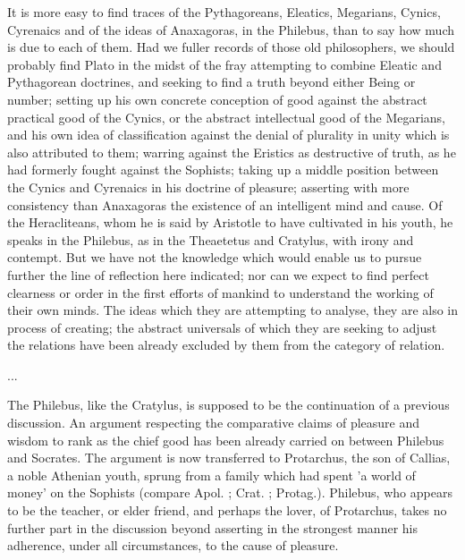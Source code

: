 \documentclass[11pt,letter]{article}
\begin{document}
\par  It is more easy to find traces of the Pythagoreans, Eleatics, Megarians, Cynics, Cyrenaics and of the ideas of Anaxagoras, in the Philebus, than to say how much is due to each of them. Had we fuller records of those old philosophers, we should probably find Plato in the midst of the fray attempting to combine Eleatic and Pythagorean doctrines, and seeking to find a truth beyond either Being or number; setting up his own concrete conception of good against the abstract practical good of the Cynics, or the abstract intellectual good of the Megarians, and his own idea of classification against the denial of plurality in unity which is also attributed to them; warring against the Eristics as destructive of truth, as he had formerly fought against the Sophists; taking up a middle position between the Cynics and Cyrenaics in his doctrine of pleasure; asserting with more consistency than Anaxagoras the existence of an intelligent mind and cause. Of the Heracliteans, whom he is said by Aristotle to have cultivated in his youth, he speaks in the Philebus, as in the Theaetetus and Cratylus, with irony and contempt. But we have not the knowledge which would enable us to pursue further the line of reflection here indicated; nor can we expect to find perfect clearness or order in the first efforts of mankind to understand the working of their own minds. The ideas which they are attempting to analyse, they are also in process of creating; the abstract universals of which they are seeking to adjust the relations have been already excluded by them from the category of relation.

\par  ...

\par  The Philebus, like the Cratylus, is supposed to be the continuation of a previous discussion. An argument respecting the comparative claims of pleasure and wisdom to rank as the chief good has been already carried on between Philebus and Socrates. The argument is now transferred to Protarchus, the son of Callias, a noble Athenian youth, sprung from a family which had spent 'a world of money' on the Sophists (compare Apol. ; Crat. ; Protag.). Philebus, who appears to be the teacher, or elder friend, and perhaps the lover, of Protarchus, takes no further part in the discussion beyond asserting in the strongest manner his adherence, under all circumstances, to the cause of pleasure.
\end{document}
